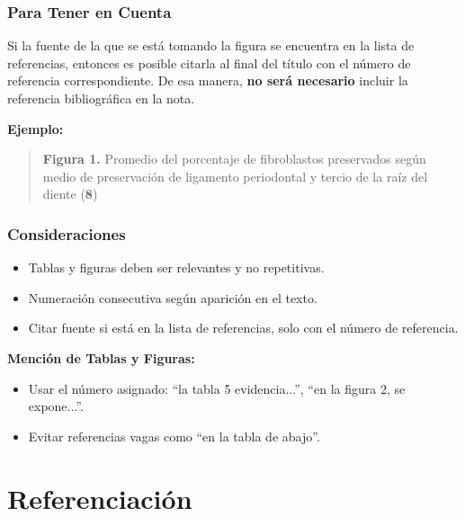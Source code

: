 \documentclass[
11pt, %
]{beamer}
\begin{document}
\begin{frame}
	\frametitle{Para Tener en Cuenta}

	Si la fuente de la que se está tomando la figura se encuentra en la lista de referencias, entonces es posible citarla al final del título con el número de referencia correspondiente. De esa manera, \textbf{no será necesario} incluir la referencia bibliográfica en la nota.

	\textbf{Ejemplo:}

	\begin{quote}
		\textbf{Figura 1.} Promedio del porcentaje de fibroblastos preservados según medio de preservación de ligamento periodontal y tercio de la raíz del diente (\textbf{8})
	\end{quote}

\end{frame}

\begin{frame}
	\frametitle{Consideraciones}

	\begin{itemize}
		\item Tablas y figuras deben ser relevantes y no repetitivas.
		\item Numeración consecutiva según aparición en el texto.
		\item Citar fuente si está en la lista de referencias, solo con el número de referencia.
	\end{itemize}

	\textbf{Mención de Tablas y Figuras:}
	\begin{itemize}
		\item Usar el número asignado: “la tabla 5 evidencia...”, “en la figura 2, se expone...”.
		\item Evitar referencias vagas como “en la tabla de abajo”.
	\end{itemize}

\end{frame}


\section{Referenciación}
\end{document}
